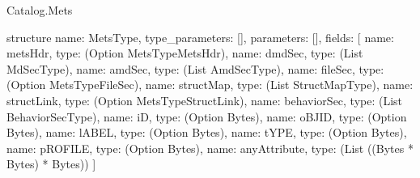 \begin{lexlean}{Catalog.Mets}
\begin{semanticmodule}
structure{
  name: MetsType,
  type_parameters: [],
  parameters: [],
  fields: [
    {name: metsHdr, type: (Option MetsTypeMetsHdr)},
    {name: dmdSec, type: (List MdSecType)},
    {name: amdSec, type: (List AmdSecType)},
    {name: fileSec, type: (Option MetsTypeFileSec)},
    {name: structMap, type: (List StructMapType)},
    {name: structLink, type: (Option MetsTypeStructLink)},
    {name: behaviorSec, type: (List BehaviorSecType)},
    {name: iD, type: (Option Bytes)},
    {name: oBJID, type: (Option Bytes)},
    {name: lABEL, type: (Option Bytes)},
    {name: tYPE, type: (Option Bytes)},
    {name: pROFILE, type: (Option Bytes)},
    {name: anyAttribute, type: (List ((Bytes * Bytes) * Bytes))}
  ]
}
\end{semanticmodule}
\end{lexlean}
